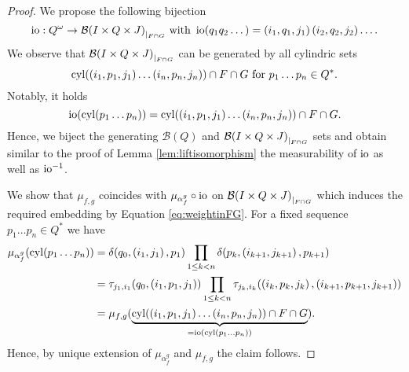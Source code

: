 \begin{proof}
  We propose the following bijection
  \begin{equation*}
    \operatorname{io}:Q^{\omega}\rightarrow{\mathcal{B}(I\times Q\times J)}_{|_{F\cap G}}\text{ with }
    \operatorname{io}(q_{1}q_{2}\dots) = \left(i_{1}, q_{1}, j_{1}\right)
      \left(i_{2}, q_{2}, j_{2}\right)\dots.
  \end{equation*}
  We observe that ${\mathcal{B}(I\times Q\times J)}_{|_{F\cap G}}$ can
  be generated by all cylindric sets
  \begin{equation*}
    \operatorname{cyl}(\left(i_{1}, p_{1}, j_{1}\right)\dots\left(i_{n}, p_{n}, j_{n}\right))
    \cap F\cap G \text{ for }p_{1}\dots p_{n}\in Q^{*}. 
  \end{equation*}
  Notably, it holds 
  \begin{equation*}
    \operatorname{io}(\operatorname{cyl}(p_{1}\dots p_{n})) = \operatorname{cyl}(\left(i_{1}, p_{1}, j_{1}\right)\dots
  \left(i_{n}, p_{n}, j_{n}\right))\cap F\cap G.
  \end{equation*}
  Hence, we biject the generating $\mathcal{B}(Q)$ and 
  ${\mathcal{B}(I\times Q\times J)}_{|_{F\cap G}}$ sets and obtain
  similar to the proof of Lemma \ref{lem:liftisomorphism} the measurability of
  $\operatorname{io}$ as well as $\operatorname{io}^{-1}$.

  We show that $\mu_{f,g}$ coincides with $\mu_{\alpha_{f}^{g}}\circ\operatorname{io}$
  on ${\mathcal{B}(I\times Q\times J)}_{|_{F\cap G}}$ which induces the
  required embedding by Equation \ref{eq:weightinFG}. For a fixed sequence
  $p_{1}\dots p_{n}\in Q^{*}$ we have
  \begin{align*}
    \mu_{\alpha_{f}^{g}}(\operatorname{cyl}(p_{1}\dots p_{n})) 
    &= \delta(q_{0}, \left(i_{1}, j_{1}\right), p_{1})
      \prod\limits_{1\leq k < n}\delta(p_{k}, \left(i_{k+1}, j_{k+1}\right), 
        p_{k+1})\\
    &= \tau_{j_{1}, i_{1}}(q_{0}, \left(i_{1}, p_{1}, j_{1}\right))
      \prod\limits_{1\leq k < n}\tau_{j_{k}, i_{k}}(\left(i_{k}, p_{k}, 
        j_{k}\right),\left(i_{k+1}, p_{k+1}, j_{k+1}\right))\\
    &= \mu_{f, g}(\underbrace{\operatorname{cyl}(\left(i_{1}, p_{1}, j_{1}\right)
      \dots\left(i_{n}, p_{n}, j_{n}\right))\cap F\cap G}_{
        = \operatorname{io}(\operatorname{cyl}(p_{1}\dots p_{n}))
      }).
  \end{align*}
  Hence, by unique extension of $\mu_{\alpha_{f}^{g}}$ and $\mu_{f,g}$ the
  claim follows.
\end{proof}

